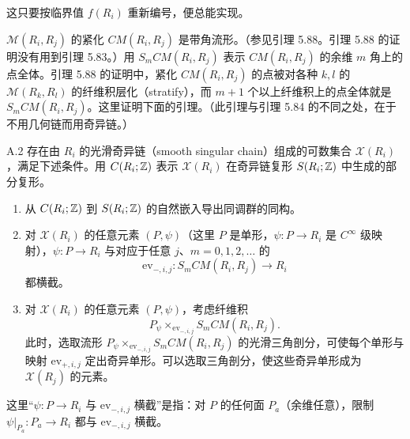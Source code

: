 这只要按临界值 $f(R_i)$ 重新编号，便总能实现。


$\mathcal{M}(R_i,R_j)$ 的紧化 $CM(R_i,R_j)$ 是带角流形。（参见引理 5.88。引理 5.88 的证明没有用到引理 5.83。）用 $S_mCM(R_i,R_j)$ 表示 $CM(R_i,R_j)$ 的余维 $m$ 角上的点全体。引理 5.88 的证明中，紧化 $CM(R_i,R_j)$ 的点被对各种 $k,l$ 的 $\mathcal{M}(R_k,R_l)$ 的纤维积层化（stratify），而 $m+1$ 个以上纤维积上的点全体就是 $S_mCM(R_i,R_j)$。这里证明下面的引理。（此引理与引理 5.84 的不同之处，在于不用几何链而用奇异链。）

\begin{lemma*}{A.2}
  存在由 $R_i$ 的光滑奇异链（smooth singular chain）组成的可数集合 $\mathcal{X}(R_i)$，满足下述条件。用 $C(R_i;\mathbb{Z})$ 表示 $\mathcal{X}(R_i)$ 在奇异链复形 $S(R_i;\mathbb{Z})$ 中生成的部分复形。
  \begin{enumerate}[label=（\arabic*）,leftmargin=2.4em]
    \item 从 $C(R_i;\mathbb{Z})$ 到 $S(R_i;\mathbb{Z})$ 的自然嵌入导出同调群的同构。
    \item 对 $\mathcal{X}(R_i)$ 的任意元素 $(P,\psi)$（这里 $P$ 是单形，$\psi\colon P\to R_i$ 是 $C^\infty$ 级映射），$\psi\colon P\to R_i$ 与对应于任意 $j$、$m=0,1,2,\dots$ 的
    \[
      \mathrm{ev}_{-,i,j}\colon S_mCM(R_i,R_j)\to R_i
    \]
    都横截。
    \item 对 $\mathcal{X}(R_i)$ 的任意元素 $(P,\psi)$，考虑纤维积
    \[
      P_\psi\times_{\mathrm{ev}_{-,i,j}}S_mCM(R_i,R_j).
    \]
    此时，选取流形 $P_\psi\times_{\mathrm{ev}_{-,i,j}}S_mCM(R_i,R_j)$ 的光滑三角剖分，可使每个单形与映射 $\mathrm{ev}_{+,i,j}$ 定出奇异单形。可以选取三角剖分，使这些奇异单形成为 $\mathcal{X}(R_j)$ 的元素。
  \end{enumerate}
\end{lemma*}

这里“$\psi\colon P\to R_i$ 与 $\mathrm{ev}_{-,i,j}$ 横截”是指：对 $P$ 的任何面 $P_a$（余维任意），限制 $\psi|_{P_a}\colon P_a\to R_i$ 都与 $\mathrm{ev}_{-,i,j}$ 横截。

